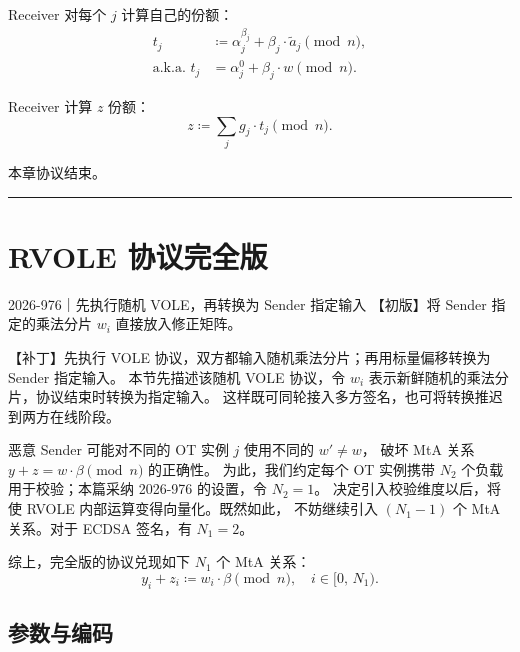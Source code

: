 Receiver 对每个 $j$ 计算自己的份额：
\begin{align}t_j                  & \coloneq \alpha^{\beta_j}_j+\beta_j\cdot\tilde{a}_j \pmod n, \\
             \textrm{a.k.a.~} t_j & = \alpha^0_j + \beta_j \cdot w \pmod n.
\end{align}

Receiver 计算 $z$ 份额：
\begin{equation}\label{eq:06-rvole:7}
  z \coloneq \sum_j g_j \cdot t_j \pmod{n}.
\end{equation}

本章协议结束。

\begin{center}\rule{0.5\linewidth}{0.5pt}\end{center}

\section{RVOLE 协议完全版}

\begin{patchnote}{2026-976｜先执行随机 VOLE，再转换为 Sender 指定输入}
  【初版】将 Sender 指定的乘法分片 $w_i$ 直接放入修正矩阵。

  【补丁】先执行 VOLE 协议，双方都输入随机乘法分片；再用标量偏移转换为 Sender 指定输入。
  本节先描述该随机 VOLE 协议，令 $w_i$ 表示新鲜随机的乘法分片，协议结束时转换为指定输入。
  这样既可同轮接入多方签名，也可将转换推迟到两方在线阶段。
\end{patchnote}

恶意 Sender 可能对不同的 OT 实例 $j$ 使用不同的 $w' \neq w$，
破坏 MtA 关系 $y + z = w \cdot \beta \pmod n$ 的正确性。
为此，我们约定每个 OT 实例携带 $N_2$ 个负载用于校验；本篇采纳 2026-976 的设置，令 $N_2=1$。
决定引入校验维度以后，将使 RVOLE 内部运算变得向量化。既然如此，
不妨继续引入 $(N_1-1)$ 个 MtA 关系。对于 ECDSA 签名，有 $N_1=2$。

综上，完全版的协议兑现如下 $N_1$ 个 MtA 关系：
\begin{equation}\label{eq:06-rvole:batch-mta}
  y_{i}+z_{i} \coloneq w_{i}\cdot \beta \pmod n,
  \quad i \in [0,\, N_1). \tag{batch-mta}
\end{equation}

\subsection{参数与编码}
\label{sec:rvole:parameters-model}

